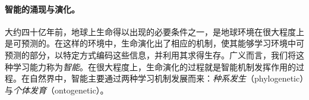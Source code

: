 \documentclass[../../book-main.tex]{subfiles}
\begin{document}
\paragraph{智能的涌现与演化。}
    

大约四十亿年前，地球上生命得以出现的必要条件之一，是地球环境在很大程度上是可预测的。在这样的环境中，生命演化出了相应的机制，使其能够学习环境中可预测的部分，以特定方式编码这些信息，并利用其求得生存。广义而言，我们将这种学习能力称为{\em 智能}。在很大程度上，生命演化的过程就是智能机制发挥作用的过程。在自然界中，智能主要通过两种学习机制发展而来：{\em 种系发生}（phylogenetic）与{\em 个体发育}（ontogenetic）\cite{Wiener-Cybernetics-1961}。%
\end{document}
